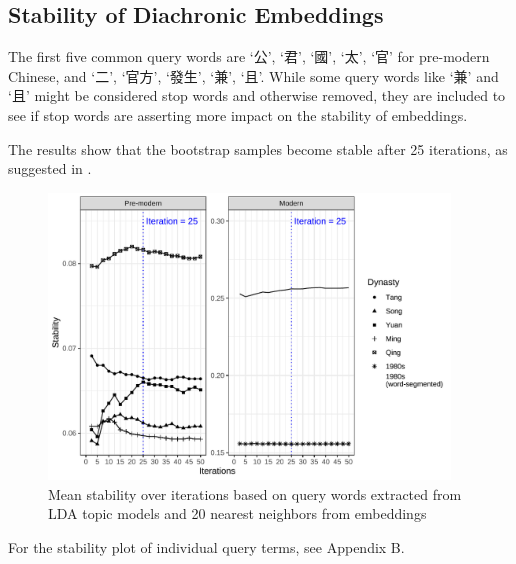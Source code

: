 \subsection{Stability of  Diachronic Embeddings}

The first five common query words are `公', `君', `國', `太', `官' for pre-modern Chinese, and `二', `官方', `發生', `兼', `且'. While some query words like `兼' and `且' might be considered stop words and otherwise removed, they are included to see if stop words are asserting more impact on the stability of  embeddings.

The results show that the bootstrap samples become stable after 25 iterations, as suggested in \textcite{antoniak2018evaluating}. 

\begin{figure}[H]
  \centering
  \includegraphics[width=0.95\textwidth,keepaspectratio]{figures_new/bootstrap_for_stability/stability.pdf}
  \caption{Mean stability over iterations based on query words extracted from LDA topic models and 20 nearest neighbors from  embeddings}
\end{figure}

For the stability plot of individual query terms, see Appendix B.

